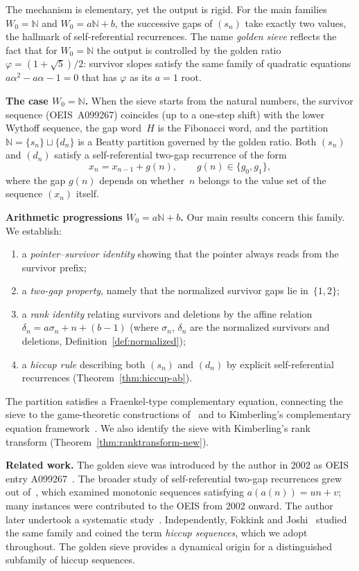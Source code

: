 \documentclass[11pt]{article}
\numberwithin{equation}{section}
\theoremstyle{plain}
\theoremstyle{definition}
\theoremstyle{remark}
\newcommand{\N}{\mathbb{N}}
\begin{document}
The mechanism is elementary, yet the output is rigid.  For the main
families $W_0=\N$ and $W_0=a\N+b$, the successive gaps of $(s_n)$ take exactly two values,
the hallmark of self-referential recurrences.
The name \emph{golden sieve} reflects the fact that for $W_0=\N$ the output
is controlled by the golden ratio $\varphi=(1+\sqrt{5})/2$: survivor slopes satisfy
the same family of quadratic equations $a\alpha^2-a\alpha-1=0$ that
has $\varphi$ as its $a=1$ root.

\smallskip
\noindent\textbf{The case $W_0=\N$.}
When the sieve starts from the natural numbers, the survivor sequence
(OEIS~A099267) coincides (up to a one-step shift) with the lower Wythoff sequence, the
gap word~$H$ is the Fibonacci word, and the partition $\N=\{s_n\}\sqcup\{d_n\}$
is a Beatty partition governed by the golden ratio.  Both $(s_n)$
and $(d_n)$ satisfy a self-referential two-gap recurrence of the form
\[
  x_n = x_{n-1}+g(n), \qquad g(n)\in\{g_0,g_1\},
\]
where the gap $g(n)$ depends on whether~$n$ belongs to the value set
of the sequence $(x_n)$ itself.

\smallskip
\noindent\textbf{Arithmetic progressions $W_0=a\N+b$.}
Our main results concern this family.  We establish:
\begin{enumerate}[label=(\roman*)]
\item a \emph{pointer--survivor identity} showing that the pointer
  always reads from the survivor prefix;
\item a \emph{two-gap property}, namely that the normalized survivor gaps lie
  in~$\{1,2\}$;
\item a \emph{rank identity} relating survivors and deletions by the
  affine relation $\delta_n = a\sigma_n + n + (b-1)$
  (where $\sigma_n$, $\delta_n$ are the normalized survivors and
  deletions, Definition~\ref{def:normalized});
\item a \emph{hiccup rule} describing both $(s_n)$ and $(d_n)$ by
  explicit self-referential recurrences (Theorem~\ref{thm:hiccup-ab}).
\end{enumerate}
The partition satisfies a Fraenkel-type complementary equation,
connecting the sieve to the game-theoretic constructions
of~\cite{Fraenkel1969,Fraenkel1998} and to Kimberling's complementary
equation framework~\cite{Kimberling1993,Kimberling2007,Kimberling2008}.
We also identify the sieve with Kimberling's rank transform
(Theorem~\ref{thm:ranktransform-new}).

\smallskip
\noindent\textbf{Related work.}
The golden sieve was introduced by the author in 2002 as OEIS entry A099267~\cite{OEIS}.
The broader study of self-referential two-gap recurrences grew out of~\cite{CSV2003},
which examined monotonic sequences satisfying $a(a(n))=un+v$; many instances were
contributed to the OEIS from 2002 onward.  The author later undertook a
systematic study~\cite{Cloitre2025}.  Independently, Fokkink and
Joshi~\cite{FJ2026} studied the same family and coined the term
\emph{hiccup sequences}, which we adopt throughout.
The golden sieve provides a dynamical origin for a distinguished
subfamily of hiccup sequences.
\end{document}
